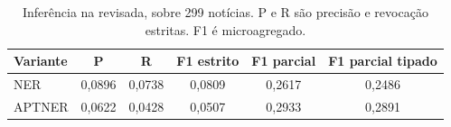 \begin{table}[ht]
\centering
\caption{Inferência na revisada, sobre 299 notícias. P e R são precisão e revocação estritas. F1 é microagregado.}
\label{tab:inferencia}
\begin{tabular}{l|c|c|c|c|c}
\hline
\textbf{Variante} & \textbf{P} & \textbf{R} & \textbf{F1 estrito} & \textbf{F1 parcial} & \textbf{F1 parcial tipado} \\
\hline
NER & 0,0896 & 0,0738 & 0,0809 & 0,2617 & 0,2486 \\
APTNER & 0,0622 & 0,0428 & 0,0507 & 0,2933 & 0,2891 \\
\hline
\end{tabular}
\end{table}

